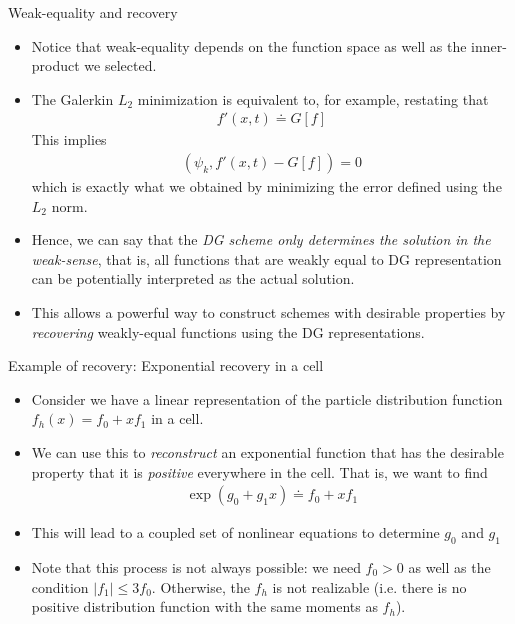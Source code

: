 \documentclass[aspectratio=169]{beamer}
\newcommand{\mypause}{}
\begin{document}
\begin{frame}{Weak-equality and recovery}
  \small
  \begin{itemize}
  \item Notice that weak-equality depends on the function space as
    well as the inner-product we selected.
  \item The Galerkin $L_2$ minimization is equivalent to, for example,
    restating that
    \begin{align*}
      f'(x,t) \doteq G[f]
    \end{align*}
    This implies
    \begin{align*}
      \left(\psi_k, f'(x,t)- G[f] \right) = 0
    \end{align*}
    which is exactly what we obtained by minimizing the error defined    
    using the  $L_2$ norm. \mypause
  \item Hence, we can say that the \emph{DG scheme only determines the
      solution in the weak-sense}, that is, all functions that are
    weakly equal to DG representation can be potentially interpreted
    as the actual solution.
  \item This allows a powerful way to construct schemes with desirable
    properties by \emph{recovering} weakly-equal functions using the
    DG representations.
  \end{itemize}

\end{frame}

\begin{frame}{Example of recovery: Exponential recovery in a cell}

  \begin{itemize}
  \item Consider we have a linear representation of the particle
    distribution function $f_h(x) = f_0 + x f_1$ in a cell.
  \item We can use this to \emph{reconstruct} an exponential function
    that has the desirable property that it is \emph{positive}
    everywhere in the cell. That is, we want to find
    \begin{align*}
      \exp(g_0 + g_1 x) \doteq f_0 + x f_1
    \end{align*}
  \item This will lead to a coupled set of nonlinear equations to
    determine $g_0$ and $g_1$
  \item Note that this process is not always possible: we need $f_0>0$
    as well as the condition $|f_1| \le 3 f_0$. Otherwise, the $f_h$
    is not realizable (i.e. there is no positive distribution function
    with the same moments as $f_h$).
  \end{itemize}
\end{frame}
\end{document}
